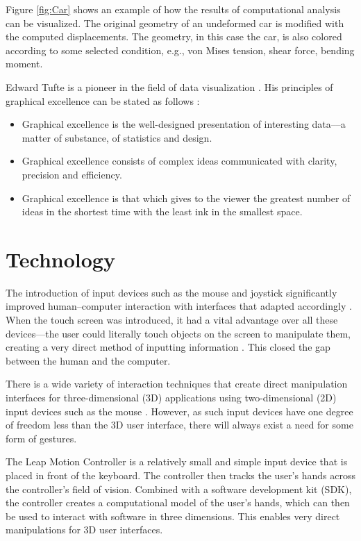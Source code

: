 Figure \ref{fig:Car} shows an example of how the results of computational analysis can be visualized. The original geometry of an undeformed car is modified with the computed displacements. The geometry, in this case the car, is also colored according to some selected condition, e.g., von Mises tension, shear force, bending moment. 

Edward Tufte is a pioneer in the field of data visualization \cite{tufte1997visual, tufte1990envisioning, tufte2001the}. His principles of graphical excellence can be stated as follows \cite{tufte2001the}:

\begin{itemize} 
\item Graphical excellence is the well-designed presentation of interesting data--–a matter of substance, of statistics and design.
\item Graphical excellence consists of complex ideas communicated with clarity, precision and efficiency.
\item Graphical excellence is that which gives to the viewer the greatest number of ideas in the shortest time with the least ink in the smallest space.
\end{itemize} 

\section{Technology}
The introduction of input devices such as the mouse and joystick significantly improved human--computer interaction with interfaces that adapted accordingly \cite{Sears1990}. When the touch screen was introduced, it had a vital advantage over all these devices---the user could literally touch objects on the screen to manipulate them, creating a very direct method of inputting information \cite{Sears1990}. This closed the gap between the human and the computer.

There is a wide variety of interaction techniques that create direct manipulation interfaces for three-dimensional (3D) applications using two-dimensional (2D) input devices such as the mouse \cite{Nielson:1987:DMT:319120.319134}. However, as such input devices have one degree of freedom less than the 3D user interface, there will always exist a need for some form of gestures. 

The Leap Motion Controller \cite{LeapMotion2013} is a relatively small and simple input device that is placed in front of the keyboard. The controller then tracks the user’s hands across the controller’s field of vision. Combined with a software development kit (SDK), the controller creates a computational model of the user’s hands, which can then be used to interact with software in three dimensions. This enables very direct manipulations for 3D user interfaces.

